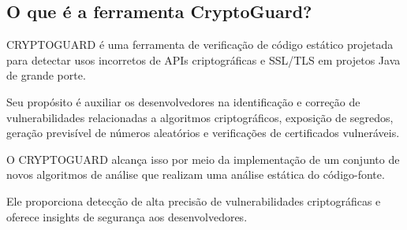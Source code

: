 \subsection{O que é a ferramenta CryptoGuard?}

CRYPTOGUARD é uma ferramenta de verificação de código estático projetada para detectar usos incorretos de APIs criptográficas e SSL/TLS em projetos Java de grande porte. 

Seu propósito é auxiliar os desenvolvedores na identificação e correção de vulnerabilidades relacionadas a algoritmos criptográficos, exposição de segredos, geração previsível de números aleatórios e verificações de certificados vulneráveis. \cite{CryptoGuard} 

O CRYPTOGUARD alcança isso por meio da implementação de um conjunto de novos algoritmos de análise que realizam uma análise estática do código-fonte. 

Ele proporciona detecção de alta precisão de vulnerabilidades criptográficas e oferece insights de segurança aos desenvolvedores. \cite{CryptoGuard} 




